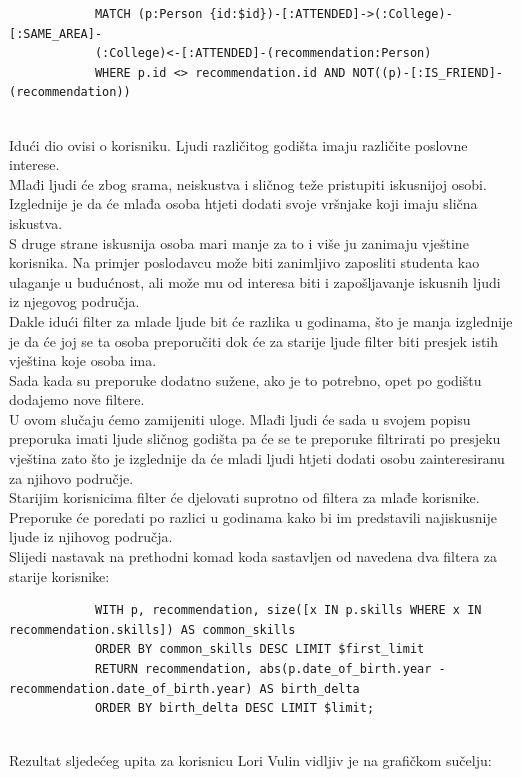 \documentclass[titlepage, 12pt]{scrartcl}
\begin{document}
	\begin{samepage}
		\begin{verbatim}
			MATCH (p:Person {id:$id})-[:ATTENDED]->(:College)-[:SAME_AREA]-
			(:College)<-[:ATTENDED]-(recommendation:Person)
			WHERE p.id <> recommendation.id AND NOT((p)-[:IS_FRIEND]-(recommendation))
			
		\end{verbatim}
	\end{samepage}
	Idući dio ovisi o korisniku. Ljudi različitog godišta imaju različite poslovne interese. \\
	Mlađi ljudi će zbog srama, neiskustva i sličnog teže pristupiti  iskusnijoj osobi. Izglednije je da će mlađa osoba htjeti dodati svoje vršnjake koji imaju slična iskustva. \\
	S druge strane iskusnija osoba mari manje za to i više ju zanimaju vještine korisnika. Na primjer poslodavcu može biti zanimljivo zaposliti studenta kao ulaganje u budućnost, ali može mu od interesa biti i zapošljavanje iskusnih ljudi iz njegovog područja. \\
	Dakle idući filter za mlade ljude bit će razlika u godinama, što je manja izglednije je da će joj se ta osoba preporučiti dok će za starije ljude filter biti presjek istih vještina koje osoba ima. \\
	Sada kada su preporuke dodatno sužene, ako je to potrebno, opet po godištu dodajemo nove filtere. \\
	U ovom slučaju ćemo zamijeniti uloge. Mlađi ljudi će sada u svojem popisu preporuka imati ljude sličnog godišta pa će se te preporuke filtrirati po presjeku vještina zato što je izglednije da će mladi ljudi htjeti dodati osobu zainteresiranu za njihovo područje. \\
	Starijim korisnicima filter će djelovati suprotno od filtera za mlađe korisnike. Preporuke će poredati po razlici u godinama kako bi im predstavili najiskusnije ljude iz njihovog područja. \\
	Slijedi nastavak na prethodni komad koda sastavljen od navedena dva filtera za starije korisnike:
	\begin{samepage}
		\begin{verbatim}
			WITH p, recommendation, size([x IN p.skills WHERE x IN recommendation.skills]) AS common_skills 
			ORDER BY common_skills DESC LIMIT $first_limit
			RETURN recommendation, abs(p.date_of_birth.year - recommendation.date_of_birth.year) AS birth_delta 
			ORDER BY birth_delta DESC LIMIT $limit;
			
		\end{verbatim}
	\end{samepage}
	\newpage
	Rezultat sljedećeg upita za korisnicu Lori Vulin vidljiv je na grafičkom sučelju:
	
\end{document}
